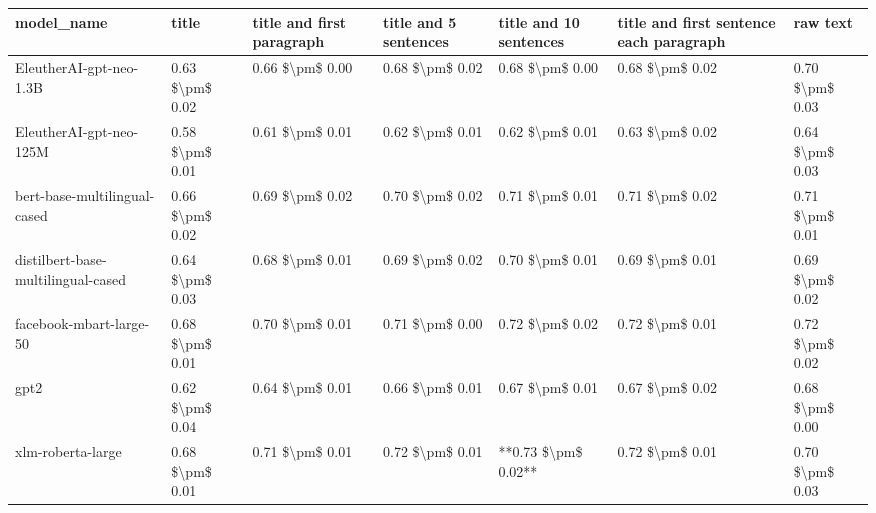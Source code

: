 \begin{tabular}{lllllll}
\toprule
                        model\_name &           title & title and first paragraph & title and 5 sentences & title and 10 sentences & title and first sentence each paragraph &        raw text \\
\midrule
           EleutherAI-gpt-neo-1.3B & 0.63 \$\textbackslash pm\$ 0.02 &           0.66 \$\textbackslash pm\$ 0.00 &       0.68 \$\textbackslash pm\$ 0.02 &        0.68 \$\textbackslash pm\$ 0.00 &                         0.68 \$\textbackslash pm\$ 0.02 & 0.70 \$\textbackslash pm\$ 0.03 \\
           EleutherAI-gpt-neo-125M & 0.58 \$\textbackslash pm\$ 0.01 &           0.61 \$\textbackslash pm\$ 0.01 &       0.62 \$\textbackslash pm\$ 0.01 &        0.62 \$\textbackslash pm\$ 0.01 &                         0.63 \$\textbackslash pm\$ 0.02 & 0.64 \$\textbackslash pm\$ 0.03 \\
      bert-base-multilingual-cased & 0.66 \$\textbackslash pm\$ 0.02 &           0.69 \$\textbackslash pm\$ 0.02 &       0.70 \$\textbackslash pm\$ 0.02 &        0.71 \$\textbackslash pm\$ 0.01 &                         0.71 \$\textbackslash pm\$ 0.02 & 0.71 \$\textbackslash pm\$ 0.01 \\
distilbert-base-multilingual-cased & 0.64 \$\textbackslash pm\$ 0.03 &           0.68 \$\textbackslash pm\$ 0.01 &       0.69 \$\textbackslash pm\$ 0.02 &        0.70 \$\textbackslash pm\$ 0.01 &                         0.69 \$\textbackslash pm\$ 0.01 & 0.69 \$\textbackslash pm\$ 0.02 \\
           facebook-mbart-large-50 & 0.68 \$\textbackslash pm\$ 0.01 &           0.70 \$\textbackslash pm\$ 0.01 &       0.71 \$\textbackslash pm\$ 0.00 &        0.72 \$\textbackslash pm\$ 0.02 &                         0.72 \$\textbackslash pm\$ 0.01 & 0.72 \$\textbackslash pm\$ 0.02 \\
                              gpt2 & 0.62 \$\textbackslash pm\$ 0.04 &           0.64 \$\textbackslash pm\$ 0.01 &       0.66 \$\textbackslash pm\$ 0.01 &        0.67 \$\textbackslash pm\$ 0.01 &                         0.67 \$\textbackslash pm\$ 0.02 & 0.68 \$\textbackslash pm\$ 0.00 \\
                 xlm-roberta-large & 0.68 \$\textbackslash pm\$ 0.01 &           0.71 \$\textbackslash pm\$ 0.01 &       0.72 \$\textbackslash pm\$ 0.01 &    **0.73 \$\textbackslash pm\$ 0.02** &                         0.72 \$\textbackslash pm\$ 0.01 & 0.70 \$\textbackslash pm\$ 0.03 \\
\bottomrule
\end{tabular}
